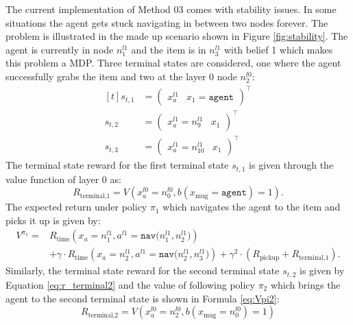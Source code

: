 The current implementation of Method 03 comes with stability issues. In some situations the agent gets stuck navigating in between two nodes forever. The problem is illustrated in the made up scenario shown in Figure \ref{fig:stability}. The agent is currently in node $n_1^{l1}$ and the item is in $n_3^{l1}$ with belief 1 which makes this problem a MDP. Three terminal states are considered, one where the agent successfully  grabs the item and two at the layer 0 node $n_2^{l0}$:
\begin{equation}
    \begin{aligned}[t]
        s_{t,1} &= \begin{pmatrix}x_a^{l1} & x_1=\texttt{agent}\end{pmatrix}^\intercal \\
        s_{t,2} &= \begin{pmatrix}x_a^{l1}=n_9^{l1} & x_1\end{pmatrix}^\intercal\\
        s_{t,3} &= \begin{pmatrix}x_a^{l1}=n_{10}^{l1} & x_1\end{pmatrix}^\intercal
    \end{aligned}
\end{equation}
%
The terminal state reward for the first terminal state $s_{t,1}$ is given through the value function of layer 0 as:
\begin{equation}
    R_{\text{terminal,}1} = V\left(x_a^{l0}=n_0^{l0}, b(x_\text{mug}=\texttt{agent})=1\right).    
\end{equation}
The expected return under policy $\pi_1$ which navigates the agent to the item and picks it up is given by:
%
\begin{equation}
    \begin{aligned}
        V^{\pi_1} = &R_\text{time}(x_a=n_1^{l1}, a^{l1}=\texttt{nav($n_1^{l1}, n_2^{l1}$)})\\ 
        &+ \gamma\cdot R_\text{time}(x_a=n_2^{l1}, a^{l1}=\texttt{nav($n_2^{l1}, n_3^{l1}$)}) + \gamma^2 \cdot (R_\text{pickup} + R_{\text{terminal,}1}).
    \end{aligned}
\end{equation}
Similarly, the terminal state reward for the second terminal state $s_{t,2}$ is given by Equation \ref{eq:r_terminal2} and the value of following policy $\pi_2$ which brings the agent to the second terminal state is shown in Formula \ref{eq:Vpi2}:
\begin{equation}\label{eq:r_terminal2}
    R_{\text{terminal,}2} = V\left( x_a^{l0}=n_2^{l0}, b(x_\text{mug}=n_0^{l0})=1 \right)
\end{equation}
